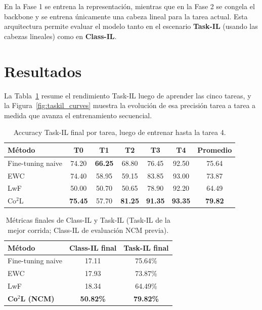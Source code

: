 \documentclass[10pt,a4paper]{article}
\begin{document}
En la Fase 1 se entrena la representación, mientras que en la Fase 2 se congela el backbone y se entrena únicamente una cabeza lineal para la tarea actual. Esta arquitectura permite evaluar el modelo tanto en el escenario \textbf{Task-IL} (usando las cabezas lineales) como en \textbf{Class-IL}.

\section{Resultados}

La Tabla~\ref{tab:final_taskil} resume el rendimiento Task-IL luego de aprender las cinco tareas, y la Figura~\ref{fig:taskil_curves} muestra la evolución de esa precisión tarea a tarea a medida que avanza el entrenamiento secuencial.

\begin{table}[H]
\centering
\caption{Accuracy Task-IL final por tarea, luego de entrenar hasta la tarea 4.}
\label{tab:final_taskil}
\begin{tabular}{lcccccc}
\toprule
Método & T0 & T1 & T2 & T3 & T4 & Promedio \\
\midrule
Fine-tuning naive & 74.20 & \textbf{66.25} & 68.80 & 76.45 & 92.50 & 75.64 \\
EWC & 74.40 & 58.95 & 59.15 & 83.85 & 93.00 & 73.87 \\
LwF & 50.00 & 50.70 & 50.65 & 78.90 & 92.20 & 64.49 \\
Co$^2$L & \textbf{75.45} & 57.70 & \textbf{81.25} & \textbf{91.35} & \textbf{93.35} & \textbf{79.82} \\
\bottomrule
\end{tabular}
\end{table}

\begin{table}[H]
\centering
\caption{Métricas finales de Class-IL y Task-IL (Task-IL de la mejor corrida; Class-IL de evaluación NCM previa).}
\begin{tabular}{lcc}
\toprule
Método & Class-IL final & Task-IL final \\
\midrule
Fine-tuning naive & 17.11 & 75.64\% \\
EWC & 17.93 & 73.87\% \\
LwF & 18.34 & 64.49\% \\
\textbf{Co$^2$L (NCM)} & \textbf{50.82\%} & \textbf{79.82\%} \\
\bottomrule
\end{tabular}
\end{table}
\end{document}
